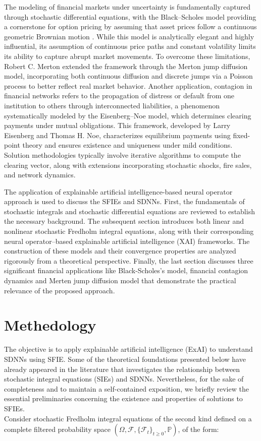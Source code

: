 \documentclass[preprint,12pt,authoryear]{elsarticle}
\begin{document}
The modeling of financial markets under uncertainty is fundamentally captured through stochastic differential equations, with the Black–Scholes model providing a cornerstone for option pricing by assuming that asset prices follow a continuous geometric Brownian motion \cite{blackscholes1973}. While this model is analytically elegant and highly influential, its assumption of continuous price paths and constant volatility limits its ability to capture abrupt market movements. To overcome these limitations, Robert C. Merton\cite{merton1976option} extended the framework through the Merton jump diffusion model, incorporating both continuous diffusion and discrete jumps via a Poisson process to better reflect real market behavior. Another application, contagion in financial networks refers to the propagation of distress or default from one institution to others through interconnected liabilities, a phenomenon systematically modeled by the Eisenberg–Noe model, which determines clearing payments under mutual obligations. This framework, developed by Larry Eisenberg and Thomas H. Noe\cite{eisenberg2001systemic}, characterizes equilibrium payments using fixed-point theory and ensures existence and uniqueness under mild conditions. Solution methodologies typically involve iterative algorithms to compute the clearing vector, along with extensions incorporating stochastic shocks, fire sales, and network dynamics. 

The application of explainable artificial intelligence-based neural operator approach is used to discuss the SFIEs and SDNNs. First, the fundamentals of stochastic integrals and stochastic differential equations are reviewed to establish the necessary background. The subsequent section introduces both linear and nonlinear stochastic Fredholm integral equations, along with their corresponding neural operator–based explainable artificial intelligence (XAI) frameworks. The construction of these models and their convergence properties are analyzed rigorously from a theoretical perspective. Finally, the last section discusses three significant financial applications like Black-Scholes's model, financial contagion dynamics and Merten jump diffusion model that demonstrate the practical relevance of the proposed approach.
\section{Methedology}
The objective is to apply explainable artificial intelligence (ExAI) to understand SDNNs using SFIE. Some of the theoretical foundations presented below have already appeared in the literature that investigates the relationship between stochastic integral equations (SIEs) and SDNNs. Nevertheless, for the sake of completeness and to maintain a self-contained exposition, we briefly review the essential preliminaries concerning the existence and properties of solutions to SFIEs.\\
Consider stochastic Fredholm integral equations of the second kind\cite{DaPratoZabczyk1992} defined on a complete filtered probability space 
$(\Omega, \mathcal{F}, \{\mathcal{F}_t\}_{t\ge0}, \mathbb{P})$, of the form:
\end{document}
